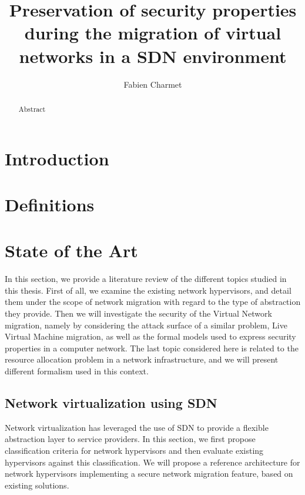 \documentclass[a4paper, 11pt]{article}
\title{\LARGE \bf Preservation of security properties during the migration of virtual networks in a SDN environment}
\author{Fabien Charmet}
\begin{document}

\maketitle

\begin{abstract}
Abstract
\end{abstract}

\tableofcontents
\listoffigures
 \listoftables
\thispagestyle{empty}


\newpage
{}
\section{Introduction}

 

\newpage
\section{Definitions}
\label{sec:basic_def}


\newpage
\section{State of the Art}
\label{sec:sota}
In this section, we provide a literature review of the different topics studied in this thesis.
First of all, we examine the existing network hypervisors, and detail them under the scope of network migration with regard to the type of abstraction they provide.
Then we will investigate the security of the Virtual Network migration, namely by considering the attack surface of a similar problem, Live Virtual Machine migration, as well as the formal models used to express security properties in a computer network.
The last topic considered here is related to the resource allocation problem in a network infrastructure, and we will present different formalism used in this context.

\subsection{Network virtualization using SDN}

Network virtualization has leveraged the use of SDN to provide a flexible abstraction layer to service providers. In this section, we first propose classification criteria for network hypervisors and then evaluate existing hypervisors against this classification. We will propose a reference architecture for network hypervisors implementing a secure network migration feature, based on existing solutions.
\end{document}
